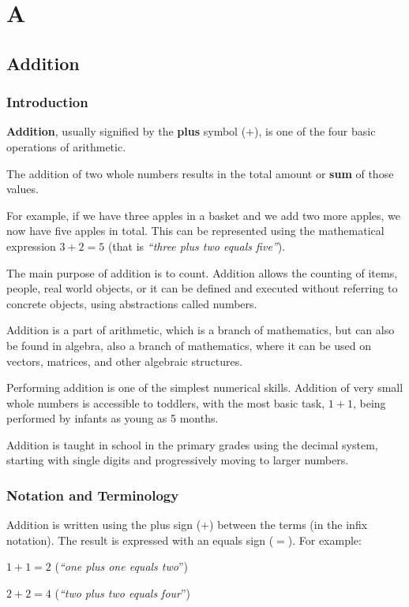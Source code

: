 \documentclass[a4paper]{book}
\begin{document}
\chapter{A}
\section{Addition}
\subsection{Introduction}
\textbf{Addition}, usually signified by the \textbf{plus} symbol ($+$),
is one of the four basic operations of arithmetic.

The addition of two whole numbers results in the total amount or \textbf{sum} of those values.

For example, if we have three apples in a basket and we add two more apples, we now have five apples in total.
This can be represented using the mathematical expression $3 + 2 = 5$
(that is \emph{``three plus two equals five''}).

The main purpose of addition is to count. Addition allows the counting of items, people, real world objects,
or it can be defined and executed without referring to concrete objects, using abstractions called numbers.

Addition is a part of arithmetic, which is a branch of mathematics, but can also be found in algebra, 
also a branch of mathematics, where it can be used on vectors, matrices, and other algebraic structures.

Performing addition is one of the simplest numerical skills. Addition of very small whole numbers is
accessible to toddlers, with the most basic task, $1 + 1$, being performed by infants as young as 5 months.

Addition is taught in school in the primary grades using the decimal system, starting with single digits
and progressively moving to larger numbers.

\subsection{Notation and Terminology}
Addition is written using the plus sign ($+$) between the terms (in the infix notation). The result is expressed
with an equals sign ($=$). For example:

$1 + 1 = 2$ (\emph{``one plus one equals two}'')

$2 + 2 = 4$ (\emph{``two plus two equals four}'')
\end{document}
